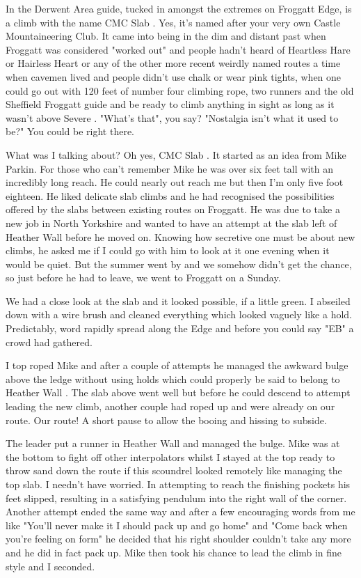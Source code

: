 \documentclass[a5paper,openany,font 10pt]{scrbook}
\begin{document}
In the Derwent Area guide, tucked in amongst the extremes on Froggatt
Edge, is a climb with the name CMC Slab . Yes, it's named after your
very own Castle Mountaineering Club. It came into being in the dim and
distant past when Froggatt was considered "worked out" and people
hadn't heard of Heartless Hare or Hairless Heart or any of the other
more recent weirdly named routes a time when cavemen lived and people
didn't use chalk or wear pink tights, when one could go out with 120
feet of number four climbing rope, two runners and the old Sheffield
Froggatt guide and be ready to climb anything in sight as long as it
wasn't above Severe . "What's that", you say? "Nostalgia isn't what it
used to be?" You could be right there.

What was I talking about? Oh yes, CMC Slab . It started as an idea
from Mike Parkin. For those who can't remember Mike he was over six
feet tall with an incredibly long reach. He could nearly out reach me
but then I'm only five foot eighteen. He liked delicate slab climbs
and he had recognised the possibilities offered by the slabs between
existing routes on Froggatt. He was due to take a new job in North
Yorkshire and wanted to have an attempt at the slab left of Heather
Wall before he moved on.  Knowing how secretive one must be about new
climbs, he asked me if I could go with him to look at it one evening
when it would be quiet. But the summer went by and we somehow didn't
get the chance, so just before he had to leave, we went to Froggatt on
a Sunday.

We had a close look at the slab and it looked possible, if a little
green. I abseiled down with a wire brush and cleaned everything which
looked vaguely like a hold. Predictably, word rapidly spread along the
Edge and before you could say "EB" a crowd had gathered.

I top roped Mike and after a couple of attempts he managed the awkward
bulge above the ledge without using holds which could properly be said
to belong to Heather Wall . The slab above went well but before he
could descend to attempt leading the new climb, another couple had
roped up and were already on our route.  Our route! A short pause to
allow the booing and hissing to subside.

The leader put a runner in Heather Wall and managed the bulge. Mike
was at the bottom to fight off other interpolators whilst I stayed at
the top ready to throw sand down the route if this scoundrel looked
remotely like managing the top slab. I needn't have worried. In
attempting to reach the finishing pockets his feet slipped, resulting
in a satisfying pendulum into the right wall of the corner. Another
attempt ended the same way and after a few encouraging words from me
like "You'll never make it I should pack up and go home" and "Come
back when you're feeling on form" he decided that his right shoulder
couldn't take any more and he did in fact pack up. Mike then took his
chance to lead the climb in fine style and I seconded.
\end{document}
